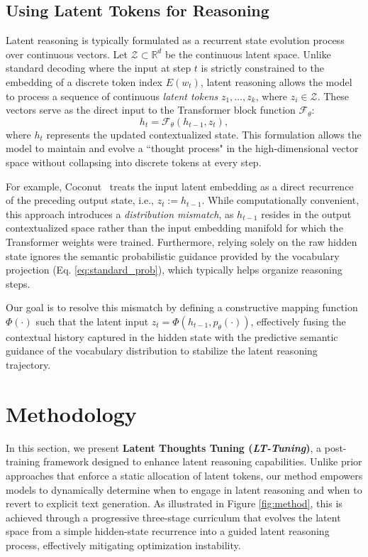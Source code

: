 \documentclass{article}
\theoremstyle{plain}
\theoremstyle{definition}
\theoremstyle{remark}
\begin{document}
\subsection{Using Latent Tokens for Reasoning}
Latent reasoning is typically formulated as a recurrent state evolution process over continuous vectors.
Let $\mathcal{Z} \subset \mathbb{R}^d$ be the continuous latent space. Unlike standard decoding where the input at step $t$ is strictly constrained to the embedding of a discrete token index $E(w_t)$, latent reasoning allows the model to process a sequence of continuous \textit{latent tokens} $z_1, \dots, z_k$, where $z_i \in \mathcal{Z}$. These vectors serve as the direct input to the Transformer block function $\mathcal{F}_\theta$:
\begin{equation}
    h_{t} = \mathcal{F}_\theta(h_{t-1}, z_{t}),
\end{equation}
where $h_t$ represents the updated contextualized state. This formulation allows the model to maintain and evolve a ``thought process" in the high-dimensional vector space without collapsing into discrete tokens at every step.

For example, Coconut~\citep{hao2024training} treats the input latent embedding as a direct recurrence of the preceding output state, i.e., $z_{t} := h_{t-1}$. While computationally convenient, this approach introduces a \textit{distribution mismatch}, as $h_{t-1}$ resides in the output contextualized space rather than the input embedding manifold for which the Transformer weights were trained. Furthermore, relying solely on the raw hidden state ignores the semantic probabilistic guidance provided by the vocabulary projection (Eq. \ref{eq:standard_prob}), which typically helps organize reasoning steps.

Our goal is to resolve this mismatch by defining a constructive mapping function $\Phi(\cdot)$ such that the latent input $z_{t} = \Phi(h_{t-1}, p_\theta(\cdot))$, effectively fusing the contextual history captured in the hidden state with the predictive semantic guidance of the vocabulary distribution to stabilize the latent reasoning trajectory.

\section{Methodology}

In this section, we present \textbf{Latent Thoughts Tuning (\textit{LT-Tuning})}, a post-training framework designed to enhance latent reasoning capabilities. Unlike prior approaches that enforce a static allocation of latent tokens, our method empowers models to dynamically determine when to engage in latent reasoning and when to revert to explicit text generation. As illustrated in Figure \ref{fig:method}, this is achieved through a progressive three-stage curriculum that evolves the latent space from a simple hidden-state recurrence into a guided latent reasoning process, effectively mitigating optimization instability.
\end{document}
